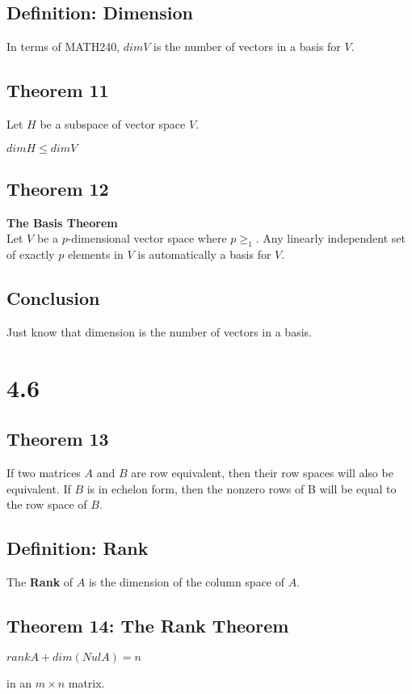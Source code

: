\documentclass{article}
\begin{document}
    \subsection*{Definition: Dimension}
    In terms of MATH240, $dim V $ is the number of vectors in a basis for  $V$.
    \subsection*{Theorem 11}
    Let $H$ be a subspace of vector space $V$. \\
    \begin{center}
        $dimH\leq dimV$
    \end{center}
    \subsection*{Theorem 12}
    \textbf{The Basis Theorem}\\
    Let $V$ be a $p$-dimensional vector space where $p\geq_1$. Any linearly independent set of exactly $p$ elements in $V$ is automatically a basis for $V$.
    \subsection*{Conclusion}
    Just know that dimension is the number of vectors in a basis.

    \section*{4.6}
    

    \subsection*{Theorem 13}
    If two matrices $A$ and $B$ are row equivalent, then their row spaces will also be equivalent. If $B$ is in echelon form, then the nonzero rows of B will be equal to the row space of $B$.



    \subsection*{Definition: Rank }
    The \textbf{Rank} of $A$ is the dimension of the column space of $A$.

     \subsection*{Theorem 14: The Rank Theorem}
     \begin{center}
     $rank A + dim(Nul A) = n $\\
    \end{center}
    in an $m\times n$ matrix.
\end{document}
